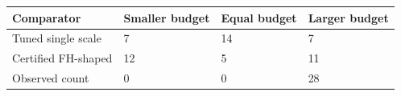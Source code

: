\begin{tabular}{llll}
\toprule
Comparator & Smaller budget & Equal budget & Larger budget \\
\midrule
Tuned single scale & 7 & 14 & 7 \\
Certified FH-shaped & 12 & 5 & 11 \\
Observed count & 0 & 0 & 28 \\
\bottomrule
\end{tabular}
